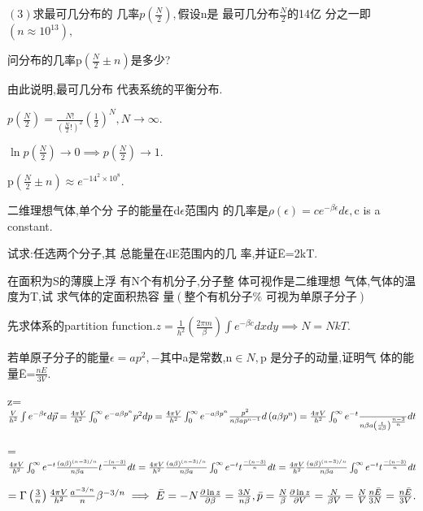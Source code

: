 \documentclass{ctexart}
\begin{document}
$\left( 3\right) $求最可几分布的%
几率$p\left( \frac{N}{2}\right) ,$假设n是%
最可几分布$\frac{N}{2}$的14亿%
分之一即$\left( n\approx 10^{13}\right) ,$

问分布的几率p$\left( \frac{N}{2}\pm
n\right) $是多少?

由此说明,最可几分布%
代表系统的平衡分布.

$p\left( \frac{N}{2}\right) =\frac{N!}{\left( \frac{N}{2}!\right) ^{2}}%
\left( \frac{1}{2}\right) ^{N},N\rightarrow \infty .$

$\ln p\left( \frac{N}{2}\right) \rightarrow 0\implies p\left( \frac{N}{2}%
\right) \rightarrow 1.$

p$\left( \frac{N}{2}\pm n\right) \approx e^{-14^{2}\times 10^{8}}.$

二维理想气体,单个分%
子的能量在d$\epsilon $范围内%
的几率是$\rho \left( \epsilon \right) =ce^{-\beta
\epsilon }d\epsilon ,$c is a constant.

试求:任选两个分子,其%
总能量在dE范围内的几%
率,并证\={E}=2kT.

\bigskip 

在面积为S的薄膜上浮%
有N个有机分子,分子整%
体可视作是二维理想%
气体,气体的温度为T,试%
求气体的定面积热容%
量$\left( \text{整个有机分子%
可视为单原子分子}\right) $

先求体系的partition function.$z=\frac{1}{h^{2}}%
\left( \frac{2\pi m}{\beta }\right) \int e^{-\beta c}dxdy\implies N=NkT.$

\bigskip 

若单原子分子的能量$%
\epsilon =ap^{2},-$其中a是常数,n$\in N,$p%
是分子的动量,证明气%
体的能量\={E}=$\frac{nE}{3V}.$

z=$\frac{V}{h^{2}}\int e^{-\beta \epsilon }d\vec{p}=\frac{4\pi V}{h^{2}}%
\int_{0}^{\infty }e^{-a\beta p^{n}}p^{2}dp=\frac{4\pi V}{h^{2}}%
\int_{0}^{\infty }e^{-a\beta p^{n}}\frac{p^{2}}{n\beta ap^{n-1}}d\left(
a\beta p^{n}\right) =\frac{4\pi V}{h^{2}}\int_{0}^{\infty }e^{-t}\frac{{}}{%
n\beta a\left( \frac{t}{a\beta }\right) ^{\frac{n-3}{n}}}dt$

=$\frac{4\pi V}{h^{2}}\int_{0}^{\infty }e^{-t}\frac{\left( a\beta \right)
^{\left( n-3\right) /n}}{n\beta a}t^{\frac{-\left( n-3\right) }{n}}dt=\frac{%
4\pi V}{h^{2}}\frac{\left( a\beta \right) ^{\left( n-3\right) /n}}{n\beta a}%
\int_{0}^{\infty }e^{-t}t^{\frac{-\left( n-3\right) }{n}}dt=\frac{4\pi V}{%
h^{2}}\frac{\left( a\beta \right) ^{\left( n-3\right) /n}}{n\beta a}%
\int_{0}^{\infty }e^{-t}t^{\frac{-\left( n-3\right) }{n}}dt$

$=\Gamma \left( \frac{3}{n}\right) \frac{4\pi V}{h^{2}}\frac{a^{-3/n}}{n}%
\beta ^{-3/n}\implies \bar{E}=-N\frac{\partial \ln z}{\partial \beta }=\frac{%
3N}{n\beta },\bar{p}=\frac{N}{\beta }\frac{\partial \ln z}{\partial V}=\frac{%
N}{\beta V}=\frac{N}{V}\frac{n\bar{E}}{3N}=\frac{n\bar{E}}{3V}.$
\end{document}
